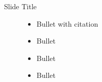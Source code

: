 \documentclass[8pt, aspectratio=169]{beamer} %
\begin{document}
\begin{frame}{Slide Title}
\begin{figure}
\begin{minipage}[b]{0.3\textwidth}
      \end{minipage}
      \hfill
      \begin{minipage}[b]{0.35\textwidth}
        \begin{itemize}
        \item Bullet with citation \cite{Author1Title}
        \item Bullet
        \item Bullet
        \item Bullet
    \end{itemize}
    \vspace{20pt}
      \end{minipage}
    \end{figure}
\end{frame}
\end{document}
